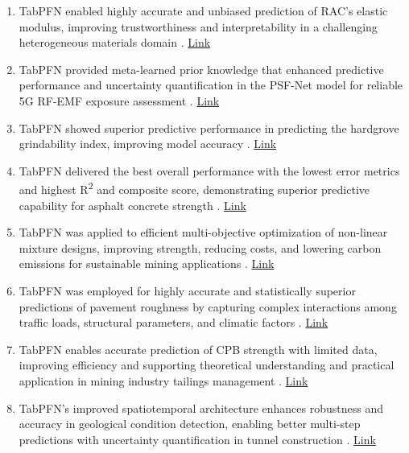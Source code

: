 \begin{enumerate}
\item TabPFN enabled highly accurate and unbiased prediction of RAC's elastic modulus, improving trustworthiness and interpretability in a challenging heterogeneous materials domain \cite{lu2025more}. \href{https://doi.org/10.3390/ma18225221}{Link}

\item TabPFN provided meta-learned prior knowledge that enhanced predictive performance and uncertainty quantification in the PSF-Net model for reliable 5G RF-EMF exposure assessment \cite{zhang2025psfnet}. \href{https://doi.org/10.4271/2025-99-0127}{Link}

\item TabPFN showed superior predictive performance in predicting the hardgrove grindability index, improving model accuracy \cite{zhu2026demystifying}. \href{https://www.sciencedirect.com/science/article/pii/S0016236126010513}{Link}

\item TabPFN delivered the best overall performance with the lowest error metrics and highest R\textsuperscript{2} and composite score, demonstrating superior predictive capability for asphalt concrete strength \cite{xing2026interpretable}. \href{https://doi.org/10.20944/preprints202603.2259.v1}{Link}

\item TabPFN was applied to efficient multi-objective optimization of non-linear mixture designs, improving strength, reducing costs, and lowering carbon emissions for sustainable mining applications \cite{wang2026cleaner}. \href{https://www.sciencedirect.com/science/article/pii/S095965262600658X}{Link}

\item TabPFN was employed for highly accurate and statistically superior predictions of pavement roughness by capturing complex interactions among traffic loads, structural parameters, and climatic factors \cite{qin2026interpretable}. \href{https://doi.org/10.3390/buildings16071358}{Link}

\item TabPFN enables accurate prediction of CPB strength with limited data, improving efficiency and supporting theoretical understanding and practical application in mining industry tailings management \cite{zhang2025strength}. \href{https://doi.org/10.1016/j.rineng.2025.108269}{Link}

\item TabPFN's improved spatiotemporal architecture enhances robustness and accuracy in geological condition detection, enabling better multi-step predictions with uncertainty quantification in tunnel construction \cite{zhang2026datadriven}. \href{https://www.sciencedirect.com/science/article/pii/S1474034626003071}{Link}


\end{enumerate}
